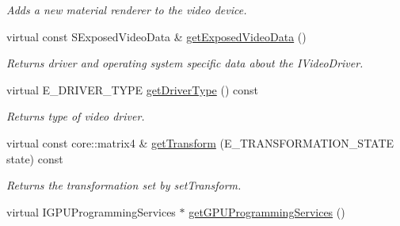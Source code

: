 \begin{DoxyCompactItemize}
\begin{DoxyCompactList}\small\item\em Adds a new material renderer to the video device. \end{DoxyCompactList}\item 
\hypertarget{classirr_1_1video_1_1_c_null_driver_a679e5ced9a84fe83ba731d966116c032}{virtual const S\-Exposed\-Video\-Data \& \hyperlink{classirr_1_1video_1_1_c_null_driver_a679e5ced9a84fe83ba731d966116c032}{get\-Exposed\-Video\-Data} ()}\label{classirr_1_1video_1_1_c_null_driver_a679e5ced9a84fe83ba731d966116c032}

\begin{DoxyCompactList}\small\item\em Returns driver and operating system specific data about the I\-Video\-Driver. \end{DoxyCompactList}\item 
\hypertarget{classirr_1_1video_1_1_c_null_driver_a8ea4150f2e2477843a058d37bd385a89}{virtual E\-\_\-\-D\-R\-I\-V\-E\-R\-\_\-\-T\-Y\-P\-E \hyperlink{classirr_1_1video_1_1_c_null_driver_a8ea4150f2e2477843a058d37bd385a89}{get\-Driver\-Type} () const }\label{classirr_1_1video_1_1_c_null_driver_a8ea4150f2e2477843a058d37bd385a89}

\begin{DoxyCompactList}\small\item\em Returns type of video driver. \end{DoxyCompactList}\item 
\hypertarget{classirr_1_1video_1_1_c_null_driver_a02bd4b0ce05df1aca67deaec6cfb258a}{virtual const core\-::matrix4 \& \hyperlink{classirr_1_1video_1_1_c_null_driver_a02bd4b0ce05df1aca67deaec6cfb258a}{get\-Transform} (E\-\_\-\-T\-R\-A\-N\-S\-F\-O\-R\-M\-A\-T\-I\-O\-N\-\_\-\-S\-T\-A\-T\-E state) const }\label{classirr_1_1video_1_1_c_null_driver_a02bd4b0ce05df1aca67deaec6cfb258a}

\begin{DoxyCompactList}\small\item\em Returns the transformation set by set\-Transform. \end{DoxyCompactList}\item 
\hypertarget{classirr_1_1video_1_1_c_null_driver_ab03460b87017c686c4236ff3414a48fc}{virtual I\-G\-P\-U\-Programming\-Services $\ast$ \hyperlink{classirr_1_1video_1_1_c_null_driver_ab03460b87017c686c4236ff3414a48fc}{get\-G\-P\-U\-Programming\-Services} ()}\label{classirr_1_1video_1_1_c_null_driver_ab03460b87017c686c4236ff3414a48fc}


\end{DoxyCompactItemize}
